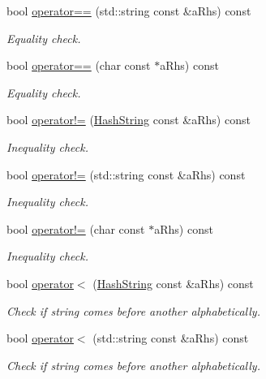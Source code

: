 \begin{DoxyCompactItemize}
bool \hyperlink{classHashString_a18159f327f6bfb8d576d13fcf2bbcf98}{operator==} (std\+::string const \&a\+Rhs) const 
\begin{DoxyCompactList}\small\item\em Equality check. \end{DoxyCompactList}\item 
bool \hyperlink{classHashString_ab3545d5a8d8a4a964255fbeac1c3770d}{operator==} (char const $\ast$a\+Rhs) const 
\begin{DoxyCompactList}\small\item\em Equality check. \end{DoxyCompactList}\item 
bool \hyperlink{classHashString_a4ca3592142920b9e8e071ab21a0f4b86}{operator!=} (\hyperlink{classHashString}{Hash\+String} const \&a\+Rhs) const 
\begin{DoxyCompactList}\small\item\em Inequality check. \end{DoxyCompactList}\item 
bool \hyperlink{classHashString_a5000bde7a2f5f4c046fbf5da5fa27909}{operator!=} (std\+::string const \&a\+Rhs) const 
\begin{DoxyCompactList}\small\item\em Inequality check. \end{DoxyCompactList}\item 
bool \hyperlink{classHashString_a4a3fe2ff601afc00aa394d5739c408df}{operator!=} (char const $\ast$a\+Rhs) const 
\begin{DoxyCompactList}\small\item\em Inequality check. \end{DoxyCompactList}\item 
bool \hyperlink{classHashString_af1465eda34d9d46afa4c0fc03f2c02be}{operator$<$} (\hyperlink{classHashString}{Hash\+String} const \&a\+Rhs) const 
\begin{DoxyCompactList}\small\item\em Check if string comes before another alphabetically. \end{DoxyCompactList}\item 
bool \hyperlink{classHashString_a4bd71fb56ec1b6a10d57568ae6db0dc9}{operator$<$} (std\+::string const \&a\+Rhs) const 
\begin{DoxyCompactList}\small\item\em Check if string comes before another alphabetically. \end{DoxyCompactList}\item 

\end{DoxyCompactItemize}
